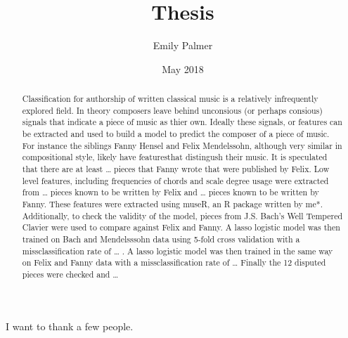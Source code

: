 \documentclass[12pt,twoside]{reedthesis}
\title{Thesis}
\author{Emily Palmer}
\date{May 2018}
\theoremstyle{definition}
\theoremstyle{definition}
\theoremstyle{definition}
\theoremstyle{remark}
\begin{document}
  \maketitle

\frontmatter %
\pagestyle{empty} %
  \begin{acknowledgements}
    I want to thank a few people.
  \end{acknowledgements}

  \hypersetup{linkcolor=black}
  \setcounter{tocdepth}{2}
  \tableofcontents

  \listoftables

  \listoffigures
  \begin{abstract}
    Classification for authorship of written classical music is a relatively
    infrequently explored field. In theory composers leave behind unconsious
    (or perhaps consious) signals that indicate a piece of music as thier
    own. Ideally these signals, or features can be extracted and used to
    build a model to predict the composer of a piece of music. For instance
    the siblings Fanny Hensel and Felix Mendelssohn, although very similar
    in compositional style, likely have featuresthat distingush their music.
    It is speculated that there are at least \ldots{} pieces that Fanny
    wrote that were published by Felix. Low level features, including
    frequencies of chords and scale degree usage were extracted from
    \ldots{} pieces known to be written by Felix and \ldots{} pieces known
    to be written by Fanny. These features were extracted using museR, an R
    package written by me*. Additionally, to check the validity of the
    model, pieces from J.S. Bach's Well Tempered Clavier were used to
    compare against Felix and Fanny. A lasso logistic model was then trained
    on Bach and Mendelsssohn data using 5-fold cross validation with a
    missclassification rate of \ldots{} . A lasso logistic model was then
    trained in the same way on Felix and Fanny data with a
    missclassification rate of \ldots{} Finally the 12 disputed pieces were
    checked and \ldots{}
  \end{abstract}

\mainmatter %
\pagestyle{fancyplain} %

\chapter{}\label{section}
\end{document}
